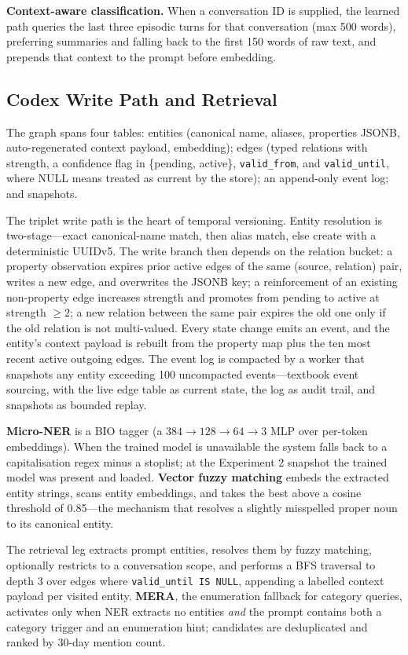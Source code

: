 \documentclass[twoside,11pt]{article}
\begin{document}
\textbf{Context-aware classification.} When a conversation ID is supplied, the learned path queries the last three episodic turns for that conversation (max 500 words), preferring summaries and falling back to the first 150 words of raw text, and prepends that context to the prompt before embedding.

\subsection{Codex Write Path and Retrieval}
\label{app:codex}

The graph spans four tables: entities (canonical name, aliases, properties JSONB, auto-regenerated context payload, embedding); edges (typed relations with strength, a confidence flag in \{pending, active\}, \texttt{valid\_from}, and \texttt{valid\_until}, where NULL means treated as current by the store); an append-only event log; and snapshots.

The triplet write path is the heart of temporal versioning. Entity resolution is two-stage---exact canonical-name match, then alias match, else create with a deterministic UUIDv5. The write branch then depends on the relation bucket: a property observation expires prior active edges of the same (source, relation) pair, writes a new edge, and overwrites the JSONB key; a reinforcement of an existing non-property edge increases strength and promotes from pending to active at strength $\geq 2$; a new relation between the same pair expires the old one only if the old relation is not multi-valued. Every state change emits an event, and the entity's context payload is rebuilt from the property map plus the ten most recent active outgoing edges. The event log is compacted by a worker that snapshots any entity exceeding 100 uncompacted events---textbook event sourcing, with the live edge table as current state, the log as audit trail, and snapshots as bounded replay.

\textbf{Micro-NER} is a BIO tagger (a $384 \rightarrow 128 \rightarrow 64 \rightarrow 3$ MLP over per-token embeddings). When the trained model is unavailable the system falls back to a capitalisation regex minus a stoplist; at the Experiment 2 snapshot the trained model was present and loaded. \textbf{Vector fuzzy matching} embeds the extracted entity strings, scans entity embeddings, and takes the best above a cosine threshold of 0.85---the mechanism that resolves a slightly misspelled proper noun to its canonical entity.

The retrieval leg extracts prompt entities, resolves them by fuzzy matching, optionally restricts to a conversation scope, and performs a BFS traversal to depth 3 over edges where \texttt{valid\_until IS NULL}, appending a labelled context payload per visited entity. \textbf{MERA}, the enumeration fallback for category queries, activates only when NER extracts no entities \emph{and} the prompt contains both a category trigger and an enumeration hint; candidates are deduplicated and ranked by 30-day mention count.
\end{document}

